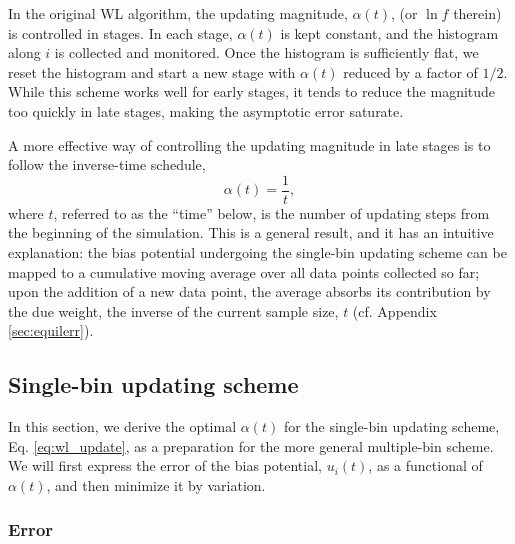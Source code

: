 \documentclass[reprint, superscriptaddress, floatfix]{revtex4-1}
\begin{document}
In the original WL algorithm\cite{
wang2001, wang2001pre},
the updating magnitude, $\alpha(t)$,
(or $\ln f$ therein)
is controlled in stages.
%
In each stage, $\alpha(t)$
is kept constant,
and the histogram along $i$
is collected and monitored.
%
Once the histogram is sufficiently flat,
we reset the histogram and start a new stage
with $\alpha(t)$ reduced by a factor of $1/2$.\cite{
  wang2001, wang2001pre}
%
While this scheme works well for early stages,
it tends to reduce the magnitude
too quickly in late stages, making the asymptotic error
saturate\cite{
belardinelli2007, *belardinelli2007jcp, *belardinelli2008, *belardinelli2016}.


A more effective way
of controlling the updating magnitude in late stages
is to follow the inverse-time schedule,\cite{
  belardinelli2007, *belardinelli2007jcp, *belardinelli2008, *belardinelli2016,
  morozov2009, zhou2008,
  komura2012, *caparica2012, *caparica2014}
%
\begin{equation}
  \alpha(t) = \frac{1}{t},
  \label{eq:alpha_invt}
\end{equation}
%
where $t$, referred to as the ``time'' below,
is the number of updating steps
from the beginning of the simulation.
%
This is a general result,\cite{robbins1951, pellegrini2014}
and it has an intuitive explanation:\cite{
  marsili2006, barducci2008}
the bias potential undergoing the single-bin updating scheme
can be mapped to a cumulative moving average over all data points collected so far;
upon the addition of a new data point,
the average absorbs its contribution by the due weight,
the inverse of the current sample size, $t$
(cf. Appendix \ref{sec:equilerr}).




\subsection{\label{sec:single-bin}
Single-bin updating scheme}



In this section,
we derive the optimal $\alpha(t)$
for the single-bin updating scheme,
Eq. \eqref{eq:wl_update},
as a preparation
for the more general multiple-bin scheme.
%
We will first express the error of
the bias potential, $u_i(t)$,
as a functional of $\alpha(t)$,
and then minimize it by variation.
%



\subsubsection{Error}
\end{document}
